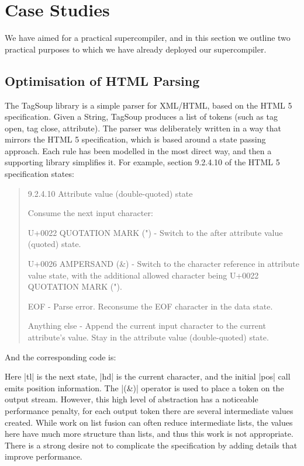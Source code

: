 \documentclass{sigplanconf}
\begin{document}
\section{Case Studies}

We have aimed for a practical supercompiler, and in this section we outline two practical purposes to which we have already deployed our supercompiler.

\subsection{Optimisation of HTML Parsing}
\label{sec:tagsoup}

The TagSoup library \cite{tagsoup} is a simple parser for XML/HTML, based on the HTML 5 specification. Given a String, TagSoup produces a list of tokens (such as tag open, tag close, attribute). The parser was deliberately written in a way that mirrors the HTML 5 specification, which is based around a state passing approach. Each rule has been modelled in the most direct way, and then a supporting library simplifies it. For example, section 9.2.4.10 of the HTML 5 specification states:

\begin{quote}
9.2.4.10 Attribute value (double-quoted) state

Consume the next input character:

U+0022 QUOTATION MARK (") - Switch to the after attribute value (quoted) state.

U+0026 AMPERSAND (\&) - Switch to the character reference in attribute value state, with the additional allowed character being U+0022 QUOTATION MARK (").

EOF - Parse error. Reconsume the EOF character in the data state.

Anything else - Append the current input character to the current attribute's value. Stay in the attribute value (double-quoted) state.
\end{quote}

And the corresponding code is:


Here |tl| is the next state, |hd| is the current character, and the initial |pos| call emits position information. The |(&)| operator is used to place a token on the output stream. However, this high level of abstraction has a noticeable performance penalty, for each output token there are several intermediate values created. While work on list fusion can often reduce intermediate lists, the values here have much more structure than lists, and thus this work is not appropriate. There is a strong desire not to complicate the specification by adding details that improve performance.
\end{document}

